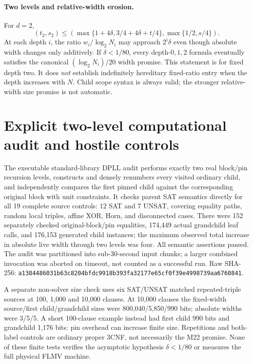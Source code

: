 \documentclass[11pt]{article}
\begin{document}
\paragraph{Two levels and relative-width erosion.}
For $d=2$,
\[
(t_2,s_2)\le
\left(\max\{1+4\delta,3/4+4\delta+t/4\},
\max\{1/2,s/4\}\right).
\]
At each depth $i$, the ratio $w_i/\log_2 N_i$ may approach $2^i\delta$ even though absolute width changes only additively. If $\delta<1/80$, every depth-$0,1,2$ formula eventually satisfies the canonical $(\log_2N_i)/20$ width promise. This statement is for fixed depth two. It does \emph{not} establish indefinitely hereditary fixed-ratio entry when the depth increases with $N$. Child scope syntax is always valid; the stronger relative-width size promise is not automatic.

\section{Explicit two-level computational audit and hostile controls}
The executable standard-library DPLL audit performs exactly two real block/pin recursion levels, constructs and densely renumbers every visited ordinary child, and independently compares the first pinned child against the corresponding original block with unit constraints. It checks parent SAT semantics directly for all 19 complete source controls: 12 SAT and 7 UNSAT, covering equality paths, random local triples, affine XOR, Horn, and disconnected cases. There were 152 separately checked original-block/pin equalities, 174,449 actual grandchild leaf calls, and 176,153 generated child instances; the maximum observed total increase in absolute live width through two levels was four. All semantic assertions passed. The audit was partitioned into sub-30-second input chunks; a larger combined invocation was aborted on timeout, not counted as a successful run. Raw SHA-256:
\texttt{a1384486031b63c8204bfdc9918b393fa32177e65cf0f39e4998739aa6760841}.

A separate non-solver size check uses six SAT/UNSAT matched repeated-triple sources at 100, 1,000 and 10,000 clauses. At 10,000 clauses the fixed-width source/first child/grandchild sizes were 800,040/5,850/990 bits; absolute widths were 3/5/5. A short 100-clause example instead had first child 990 bits and grandchild 1,176 bits: pin overhead can increase finite size. Repetitions and both-label controls are ordinary proper 3CNF, not necessarily the M22 promise. None of these finite tests verifies the asymptotic hypothesis $\delta<1/80$ or measures the full physical FLMV machine.
\end{document}

